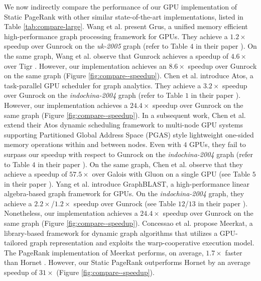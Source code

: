 We now indirectly compare the performance of our GPU implementation of Static PageRank with other similar state-of-the-art implementations, listed in Table \ref{tab:compare-large}. Wang et al. \cite{wang2021grus} present Grus, a unified memory efficient high-performance graph processing framework for GPUs. They achieve a $1.2\times$ speedup over Gunrock \cite{wang2016gunrock} on the \textit{uk-2005} graph (refer to Table $4$ in their paper \cite{wang2021grus}). On the same graph, Wang et al. observe that Gunrock achieves a speedup of $4.6\times$ over Tigr \cite{nodehi2018tigr}. However, our implementation achieves an $8.6\times$ speedup over Gunrock on the same graph (Figure \ref{fig:compare--speedup}). Chen et al. \cite{chen2022atos} introduce Atos, a task-parallel GPU scheduler for graph analytics. They achieve a $3.2\times$ speedup over Gunrock on the \textit{indochina-2004} graph (refer to Table $1$ in their paper \cite{chen2022atos}). However, our implementation achieves a $24.4\times$ speedup over Gunrock on the same graph (Figure \ref{fig:compare--speedup}). In a subsequent work, Chen et al. \cite{chen2022scalable} extend their Atos dynamic scheduling framework to multi-node GPU systems supporting Partitioned Global Address Space (PGAS) style lightweight one-sided memory operations within and between nodes. Even with $4$ GPUs, they fail to surpass our speedup with respect to Gunrock on the \textit{indochina-2004} graph (refer to Table $4$ in their paper \cite{chen2022scalable}). On the same graph, Chen et al. observe that they achieve a speedup of $57.5\times$ over Galois with Gluon \cite{dathathri2018gluon} on a single GPU (see Table $5$ in their paper \cite{chen2022scalable}). Yang et al. \cite{yang2022graphblast} introduce GraphBLAST, a high-performance linear algebra-based graph framework for GPUs. On the \textit{indochina-2004} graph, they achieve a $2.2\times$/$1.2\times$ speedup over Gunrock (see Table $12$/$13$ in their paper \cite{yang2022graphblast}). Nonetheless, our implementation achieves a $24.4\times$ speedup over Gunrock on the same graph (Figure \ref{fig:compare--speedup}). Concessao et al. \cite{concessao2023meerkat} propose Meerkat, a library-based framework for dynamic graph algorithms that utilizes a GPU-tailored graph representation and exploits the warp-cooperative execution model. The PageRank implementation of Meerkat performs, on average, $1.7\times$ faster than Hornet \cite{busato2018hornet}. However, our Static PageRank outperforms Hornet by an average speedup of $31\times$ (Figure \ref{fig:compare--speedup}).

\ignore{\clearpage}









